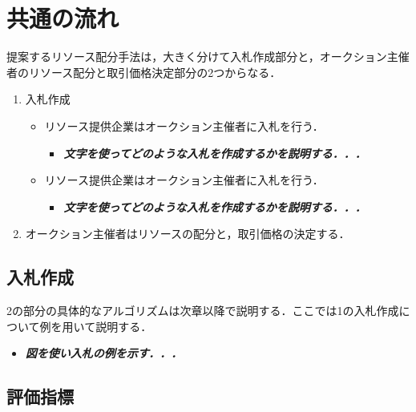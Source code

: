 \hypertarget{ux5171ux901aux306eux6d41ux308c}{%
\section{共通の流れ}\label{ux5171ux901aux306eux6d41ux308c}}

提案するリソース配分手法は，大きく分けて入札作成部分と，オークション主催者のリソース配分と取引価格決定部分の2つからなる．

\begin{enumerate}
\def\labelenumi{\arabic{enumi}.}
\tightlist
\item
  入札作成

  \begin{itemize}
  \tightlist
  \item
    リソース提供企業はオークション主催者に入札を行う．

    \begin{itemize}
    \tightlist
    \item
      \textbf{\emph{文字を使ってどのような入札を作成するかを説明する．．．}}
    \end{itemize}
  \item
    リソース提供企業はオークション主催者に入札を行う．

    \begin{itemize}
    \tightlist
    \item
      \textbf{\emph{文字を使ってどのような入札を作成するかを説明する．．．}}
    \end{itemize}
  \end{itemize}
\item
  オークション主催者はリソースの配分と，取引価格の決定する．
\end{enumerate}

\hypertarget{ux5165ux672dux4f5cux6210}{%
\subsection{入札作成}\label{ux5165ux672dux4f5cux6210}}

2の部分の具体的なアルゴリズムは次章以降で説明する．ここでは1の入札作成について例を用いて説明する．

\begin{itemize}
\tightlist
\item
  \textbf{\emph{図を使い入札の例を示す．．．}}
\end{itemize}

\hypertarget{ux8a55ux4fa1ux6307ux6a19}{%
\subsection{評価指標}\label{ux8a55ux4fa1ux6307ux6a19}}

